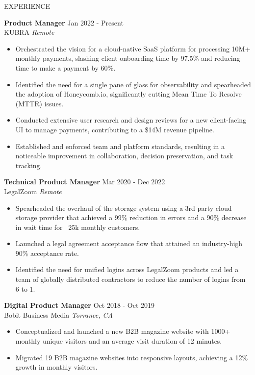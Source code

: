 \documentclass{resume} %
\begin{document}
\begin{rSection}{EXPERIENCE}

\textbf{Product Manager} \hfill Jan 2022 - Present\\
KUBRA \hfill \textit{Remote}
 \begin{itemize}
    \itemsep -3pt {} 
     \item Orchestrated the vision for a cloud-native SaaS platform for processing 10M+ monthly payments, slashing client onboarding time by 97.5\% and reducing time to make a payment by 60\%.
     \item Identified the need for a single pane of glass for observability and spearheaded the adoption of Honeycomb.io, significantly cutting Mean Time To Resolve (MTTR) issues.
     \item Conducted extensive user research and design reviews for a new client-facing UI to manage payments, contributing to a \$14M revenue pipeline.
     \item Established and enforced team and platform standards, resulting in a noticeable improvement in collaboration, decision preservation, and task tracking.
 \end{itemize}
 
\textbf{Technical Product Manager} \hfill Mar 2020 - Dec 2022\\
LegalZoom \hfill \textit{Remote}
 \begin{itemize}
    \itemsep -3pt {} 
     \item Spearheaded the overhaul of the storage system using a 3rd party cloud storage provider that achieved a 99\% reduction in errors and a 90\% decrease in wait time for ~25k monthly customers.
     \item Launched a legal agreement acceptance flow that attained an industry-high 90\% acceptance rate.
     \item Identified the need for unified logins across LegalZoom products and led a team of globally distributed contractors to reduce the number of logins from 6 to 1.
 \end{itemize}

\textbf{Digital Product Manager} \hfill Oct 2018 - Oct 2019\\
Bobit Business Media \hfill \textit{Torrance, CA}
 \begin{itemize}
    \itemsep -3pt {} 
     \item Conceptualized and launched a new B2B magazine website with 1000+ monthly unique visitors and an average visit duration of 12 minutes.    
     \item Migrated 19 B2B magazine websites into responsive layouts, achieving a 12\% growth in monthly visitors.
 \end{itemize}


\end{rSection}
\end{document}
